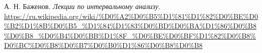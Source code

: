 \documentclass[14pt,a4paper,article]{ncc}
\begin{document}
\begin{thebibliography}{9}
     А. Н. Баженов. \textit{Лекции по интервальному анализу}.
     \\ \url{https://ru.wikipedia.org/wiki/%D0%A2%D0%B5%D1%81%D1%82%D0%BE%D0%B2%D1%8B%D0%B5_%D1%84%D1%83%D0%BD%D0%BA%D1%86%D0%B8%D0%B8_%D0%B4%D0%BB%D1%8F_%D0%BE%D0%BF%D1%82%D0%B8%D0%BC%D0%B8%D0%B7%D0%B0%D1%86%D0%B8%D0%B8}
\end{thebibliography}
\end{document}
